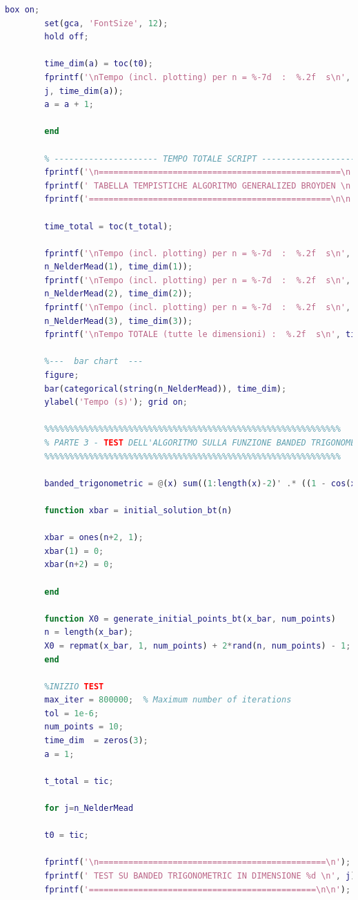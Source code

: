 \documentclass[a4paper,12pt]{article}
\begin{document}
\begin{lstlisting}[language=Matlab,caption={Full script: Nelder Mead Method on all function},label={lst:rosenbrock-extended}]
		box on;
		set(gca, 'FontSize', 12);   
		hold off;
		
		time_dim(a) = toc(t0);
		fprintf('\nTempo (incl. plotting) per n = %-7d  :  %.2f  s\n', ...
		j, time_dim(a));
		a = a + 1;
		
		end
		
		% --------------------- TEMPO TOTALE SCRIPT ----------------------
		fprintf('\n=================================================\n');
		fprintf(' TABELLA TEMPISTICHE ALGORITMO GENERALIZED BROYDEN \n');
		fprintf('=================================================\n\n');
		
		time_total = toc(t_total);
		
		fprintf('\nTempo (incl. plotting) per n = %-7d  :  %.2f  s\n', ...
		n_NelderMead(1), time_dim(1));
		fprintf('\nTempo (incl. plotting) per n = %-7d  :  %.2f  s\n', ...
		n_NelderMead(2), time_dim(2));
		fprintf('\nTempo (incl. plotting) per n = %-7d  :  %.2f  s\n', ...
		n_NelderMead(3), time_dim(3));
		fprintf('\nTempo TOTALE (tutte le dimensioni) :  %.2f  s\n', time_total);
		
		%---  bar chart  ---
		figure;
		bar(categorical(string(n_NelderMead)), time_dim);
		ylabel('Tempo (s)'); grid on;
		
		%%%%%%%%%%%%%%%%%%%%%%%%%%%%%%%%%%%%%%%%%%%%%%%%%%%%%%%%%%%%
		% PARTE 3 - TEST DELL'ALGORITMO SULLA FUNZIONE BANDED TRIGONOMETRIC 
		%%%%%%%%%%%%%%%%%%%%%%%%%%%%%%%%%%%%%%%%%%%%%%%%%%%%%%%%%%%%
		
		banded_trigonometric = @(x) sum((1:length(x)-2)' .* ((1 - cos(x(2:end-1))) + sin(x(1:end-2)) - sin(x(3:end))));
		
		function xbar = initial_solution_bt(n)
		
		xbar = ones(n+2, 1);         
		xbar(1) = 0;       
		xbar(n+2) = 0;
		
		end
		
		function X0 = generate_initial_points_bt(x_bar, num_points)
		n = length(x_bar);
		X0 = repmat(x_bar, 1, num_points) + 2*rand(n, num_points) - 1;
		end
		
		%INIZIO TEST
		max_iter = 800000;  % Maximum number of iterations
		tol = 1e-6;
		num_points = 10;
		time_dim  = zeros(3);    
		a = 1;
		
		t_total = tic;
		
		for j=n_NelderMead
		
		t0 = tic;
		
		fprintf('\n==============================================\n');
		fprintf(' TEST SU BANDED TRIGONOMETRIC IN DIMENSIONE %d \n', j);
		fprintf('==============================================\n\n');
		

\end{lstlisting}
\end{document}
